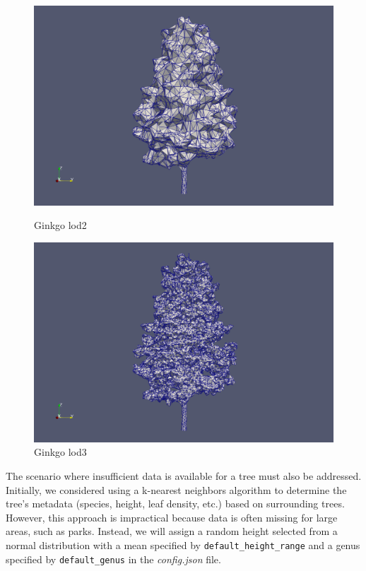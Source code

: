 \documentclass[12pt]{article}
\begin{document}
\begin{figure}[H]
    \centering
    \begin{minipage}{0.45\textwidth}
        \centering
        \includegraphics[width=1\textwidth]{images/gingko-lod2.png}
        \caption{Ginkgo lod2}
    \end{minipage}\hfill
    \begin{minipage}{0.45\textwidth}
        \centering
        \includegraphics[width=1\textwidth]{images/gingko-lod3.png}
        \caption{Ginkgo lod3}
    \end{minipage}
\end{figure}

The scenario where insufficient data is available for a tree must also be
addressed. Initially, we considered using a k-nearest neighbors
algorithm\cite{k-nn} to determine the tree's metadata (species, height,
leaf density, etc.) based on surrounding trees. However, this approach is
impractical because data is often missing for large areas, such as parks.
Instead, we will assign a random height selected from a normal distribution with
a mean specified by \texttt{default\_height\_range} and a genus specified by
\texttt{default\_genus} in the \textit{config.json} file.
\end{document}
